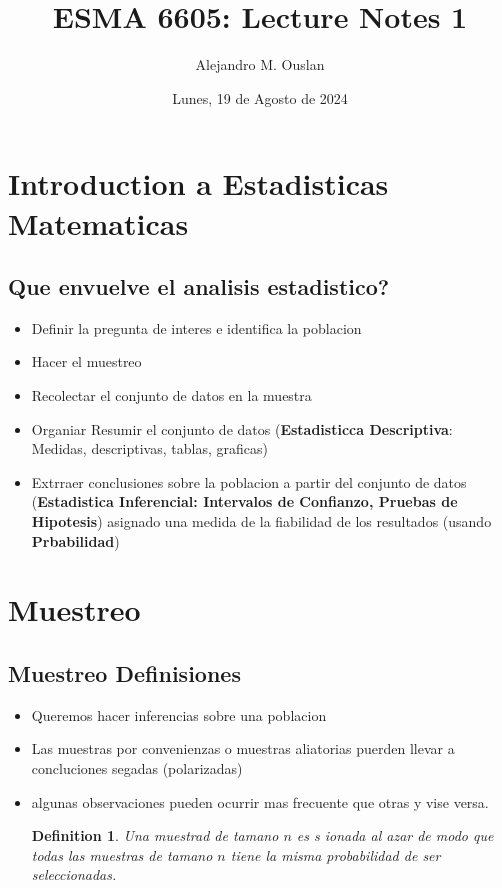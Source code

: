 \documentclass[10pt, oneside]{article}
\title{ESMA 6605: Lecture Notes 1}
\author{Alejandro M. Ouslan}
\date{Lunes, 19 de Agosto de 2024}
\newtheorem{defn}{Definition}
\begin{document}
\maketitle
\tableofcontents

\vspace{.25in}

\section{Introduction a Estadisticas Matematicas}

\subsection{Que envuelve el analisis estadistico?}

\begin{itemize}
	\item Definir la pregunta de interes e identifica la poblacion
	\item Hacer el muestreo
	\item Recolectar el conjunto de datos en la muestra
	\item Organiar Resumir el conjunto de datos (\textbf{Estadisticca Descriptiva}: Medidas, descriptivas, tablas, graficas)
	\item Extrraer conclusiones sobre la poblacion a partir del conjunto de datos (\textbf{Estadistica Inferencial: Intervalos de Confianzo, Pruebas de Hipotesis}) asignado una medida de la fiabilidad de los resultados (usando \textbf{Prbabilidad})

\end{itemize}

\section{Muestreo}

\subsection{Muestreo Definisiones}
\begin{itemize}
	\item Queremos hacer inferencias sobre una poblacion
	\item Las muestras por convenienzas o muestras aliatorias puerden llevar a concluciones segadas (polarizadas)
	\item algunas observaciones pueden ocurrir mas frecuente que otras y vise versa.
	      \begin{defn}
		      Una muestrad de tamano $n$ es s
		      ionada al azar de modo que todas las muestras de tamano $n$ tiene la misma probabilidad de ser seleccionadas.
	      \end{defn}
\end{itemize}
\end{document}
